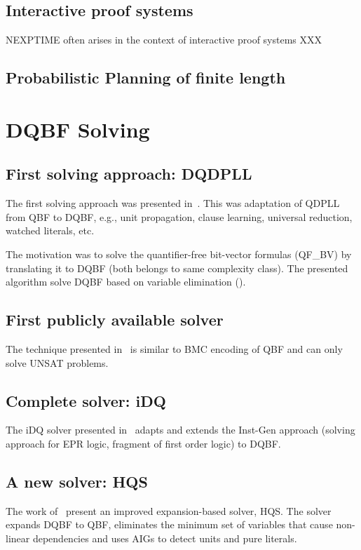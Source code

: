 \documentclass[runningheads]{llncs}
\begin{document}
\subsection{Interactive proof systems}
NEXPTIME often arises in the context of interactive proof systems XXX

\subsection{Probabilistic Planning of finite length}


\section{DQBF Solving}
\subsection{First solving approach: DQDPLL}
The first solving approach was presented in~\cite{frohlich2012dpll}.
%
This was adaptation of QDPLL from QBF to DQBF, e.g., unit propagation, clause
learning, universal reduction, watched literals, etc.
%

The motivation was to solve the quantifier-free bit-vector formulas (QF\_BV) by translating it to DQBF (both belongs to same complexity class).
%
The presented algorithm solve DQBF based on variable elimination (\cite{biere2004resolve}).

\subsection{First publicly available solver}
The technique presented in~\cite{finkbeiner2014fast} is similar to BMC encoding of QBF and can only solve UNSAT problems.

\subsection{Complete solver: iDQ}
The iDQ solver presented in~\cite{frohlich2014idq} adapts and extends the Inst-Gen approach (solving approach for EPR logic, fragment of first order logic) to DQBF.

\subsection{A new solver: HQS}
The work of~\cite{gitina2015solving} present an improved expansion-based solver, HQS.
%
The solver expands DQBF to QBF, eliminates the minimum set of variables that cause non-linear
dependencies and uses AIGs to detect units and pure literals.
\end{document}
